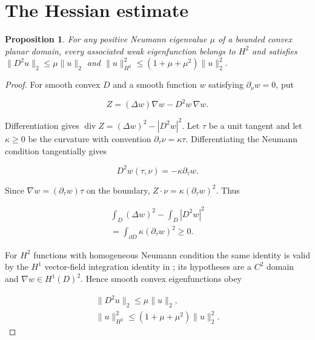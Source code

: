 \documentclass[11pt]{article}
\newtheorem{proposition}[theorem]{Proposition}
\theoremstyle{definition}
\theoremstyle{remark}
\numberwithin{equation}{section}
\begin{document}
\section{The Hessian estimate}\label{sec:hessian}
\begin{proposition}\label{prop:hessian}
For any positive Neumann eigenvalue $\mu$ of a bounded convex planar domain, every associated weak eigenfunction belongs to $H^2$ and satisfies $\|D^2u\|_2\le\mu\|u\|_2$ and $\|u\|_{H^2}^2\le(1+\mu+\mu^2)\|u\|_2^2$.
\end{proposition}
\begin{proof}
For smooth convex $D$ and a smooth function $w$ satisfying $\partial_\nu w=0$, put

\begin{equation}\label{eq:src-3-01}
Z=(\Delta w)\nabla w-D^2w\,\nabla w.
\end{equation}

Differentiation gives $\operatorname{div}Z=(\Delta w)^2-|D^2w|^2$. Let $\tau$ be a unit tangent and let $\kappa\ge0$ be the curvature with convention $\partial_\tau\nu=\kappa\tau$. Differentiating the Neumann condition tangentially gives

\begin{equation}\label{eq:src-3-02}
D^2w(\tau,\nu)=-\kappa\partial_\tau w.
\end{equation}

Since $\nabla w=(\partial_\tau w)\tau$ on the boundary, $Z\cdot\nu=\kappa(\partial_\tau w)^2$. Thus

\begin{equation}\label{eq:src-3-03}
\begin{gathered}
\int_D(\Delta w)^2-\int_D|D^2w|^2 \\
=\int_{\partial D}\kappa(\partial_\tau w)^2\ge0.
\end{gathered}
\end{equation}

For $H^2$ functions with homogeneous Neumann condition the same identity is valid by the $H^1$ vector-field integration identity in \cite[Theorem~3.1.1.1, p.~133]{Grisvard}; its hypotheses are a $C^2$ domain and $\nabla w\in H^1(D)^2$. Hence smooth convex eigenfunctions obey

\begin{equation}\label{eq:src-3-04}
\begin{gathered}
\|D^2u\|_2\le\mu\|u\|_2,\qquad \\
\|u\|_{H^2}^2\le(1+\mu+\mu^2)\|u\|_2^2.
\end{gathered}
\end{equation}


\end{proof}
\end{document}
